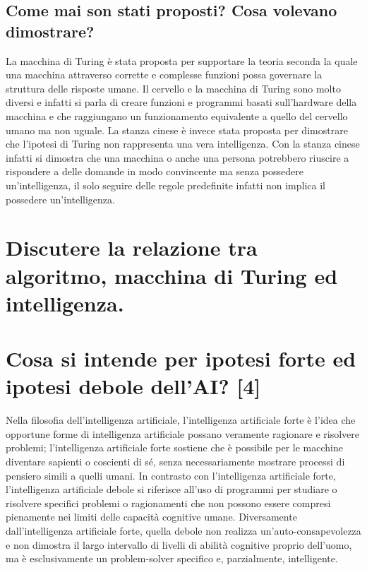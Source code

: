 \documentclass[\main/main.tex]{subfiles}
\begin{document}
\subsection{Come mai son stati proposti? Cosa volevano dimostrare?}
La macchina di Turing è stata proposta per supportare la teoria seconda la quale una macchina attraverso corrette e complesse funzioni possa governare la struttura delle risposte umane. Il cervello e la macchina di Turing sono molto diversi e infatti si parla di creare funzioni e programmi basati sull’hardware della macchina e che raggiungano un funzionamento equivalente a quello del cervello umano ma non uguale.
La stanza cinese è invece stata proposta per dimostrare che l’ipotesi di Turing non rappresenta una vera intelligenza. Con la stanza cinese infatti si dimostra che una macchina o anche una persona potrebbero riuscire a rispondere a delle domande in modo convincente ma senza possedere un’intelligenza, il solo seguire delle regole predefinite infatti non implica il possedere un’intelligenza.
\section{Discutere la relazione tra algoritmo, macchina di Turing ed intelligenza.}
\section{Cosa si intende per ipotesi forte ed ipotesi debole dell'AI? [4]}
Nella filosofia dell'intelligenza artificiale, l'intelligenza artificiale forte è l'idea che opportune forme di intelligenza artificiale possano veramente ragionare e risolvere problemi; l'intelligenza artificiale forte sostiene che è possibile per le macchine diventare sapienti o coscienti di sé, senza necessariamente mostrare processi di pensiero simili a quelli umani.
In contrasto con l'intelligenza artificiale forte, l'intelligenza artificiale debole si riferisce all'uso di programmi per studiare o risolvere specifici problemi o ragionamenti che non possono essere compresi pienamente nei limiti delle capacità cognitive umane. Diversamente dall'intelligenza artificiale forte, quella debole non realizza un'auto-consapevolezza e non dimostra il largo intervallo di livelli di abilità cognitive proprio dell'uomo, ma è esclusivamente un problem-solver specifico e, parzialmente, intelligente.
\end{document}

